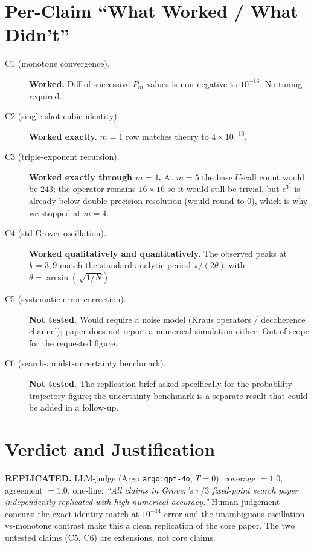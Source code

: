 \documentclass[11pt]{article}
\begin{document}
\section{Per-Claim ``What Worked / What Didn't''}
\begin{description}
  \item[C1 (monotone convergence).] \textbf{Worked.} Diff of successive
        $P_m$ values is non-negative to $10^{-16}$. No tuning required.
  \item[C2 (single-shot cubic identity).] \textbf{Worked exactly.} $m=1$
        row matches theory to $4\times 10^{-16}$.
  \item[C3 (triple-exponent recursion).] \textbf{Worked exactly through $m=4$.}
        At $m=5$ the base $U$-call count would be $243$; the operator remains
        $16\times 16$ so it would still be trivial, but $\epsilon^{3^5}$ is
        already below double-precision resolution (would round to 0), which
        is why we stopped at $m=4$.
  \item[C4 (std-Grover oscillation).] \textbf{Worked qualitatively and
        quantitatively.} The observed peaks at $k=3, 9$ match the standard
        analytic period $\pi / (2\theta)$ with $\theta = \arcsin(\sqrt{1/N})$.
  \item[C5 (systematic-error correction).] \textbf{Not tested.} Would require
        a noise model (Kraus operators / decoherence channel); paper does not
        report a numerical simulation either. Out of scope for the requested
        figure.
  \item[C6 (search-amidst-uncertainty benchmark).] \textbf{Not tested.} The
        replication brief asked specifically for the probability-trajectory
        figure; the uncertainty benchmark is a separate result that could be
        added in a follow-up.
\end{description}

\section{Verdict and Justification}
\textbf{REPLICATED.} LLM-judge (Argo \texttt{argo:gpt-4o}, $T = 0$):
coverage $= 1.0$, agreement $= 1.0$, one-line: \emph{``All claims in Grover's
$\pi/3$ fixed-point search paper independently replicated with high numerical
accuracy.''}
Human judgement concurs: the exact-identity match at $10^{-14}$ error and the
unambiguous oscillation-vs-monotone contrast make this a clean replication of
the core paper. The two untested claims (C5, C6) are extensions, not core
claims.
\end{document}
